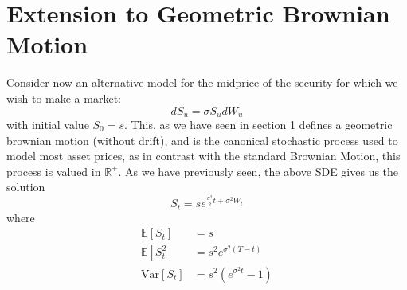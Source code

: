 \section{Extension to Geometric Brownian Motion}
Consider now an alternative model for the midprice of the security for 
which we wish to make a market:
\begin{equation*}
    dS_u=\sigma S_udW_u
\end{equation*}
with initial value $S_0=s.$ This, as we have seen in section 1 defines a 
geometric brownian motion (without drift), and is the canonical stochastic process 
used to model most asset prices, as in contrast with the standard Brownian Motion, 
this process is valued in $\mathbb{R}^+.$ As we have previously seen, the above SDE 
gives us the solution 
\begin{equation}
    S_t=se^{\frac{\sigma^2}{2}t+\sigma^2W_t}
\end{equation}
where
\begin{align*}
    \mathbb{E}[S_t]&=s\\
    \mathbb{E}[S_t^2]&=s^2e^{\sigma^2(T-t)}\\
    \textrm{Var}[S_t]&=s^2\left(e^{\sigma^2t}-1\right)
\end{align*}


